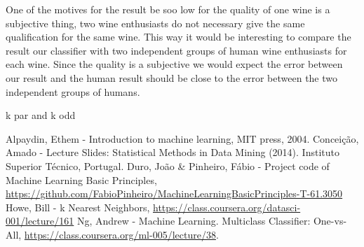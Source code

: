 \documentclass[twoside]{article}
\begin{document}
\begin{multicols}{2}
One of the motives for the result be soo low for the quality of one wine is a subjective thing, two wine enthusiasts do not necessary give the same qualification for the same wine. This way it would be interesting to compare the result our classifier with two independent groups of human wine enthusiasts for each wine. Since the quality is a subjective we would expect the error between our result and the human result should be close to the error between the two independent groups of humans.





k par and k odd 


%
%


{}
\begin{thebibliography}{}	
  Alpaydin, Ethem -   
  Introduction to machine learning, 
  MIT press,
  2004.
  Concei\c{c}\~{a}o, Amado -
  Lecture Slides: Statistical Methods in Data Mining (2014). Instituto Superior Técnico, Portugal.
  Duro, Jo\~{a}o \& Pinheiro, F\'{a}bio - Project code of Machine Learning Basic Principles,
  \url{https://github.com/FabioPinheiro/MachineLearningBasicPrinciples-T-61.3050}
  Howe, Bill - k Nearest Neighbors,
  \url{https://class.coursera.org/datasci-001/lecture/161}
  Ng, Andrew - 
  Machine Learning. Multiclass Classifier: One-vs-All,
  \url{https://class.coursera.org/ml-005/lecture/38}.

\end{thebibliography}
\end{multicols}
\newpage
\end{document}
